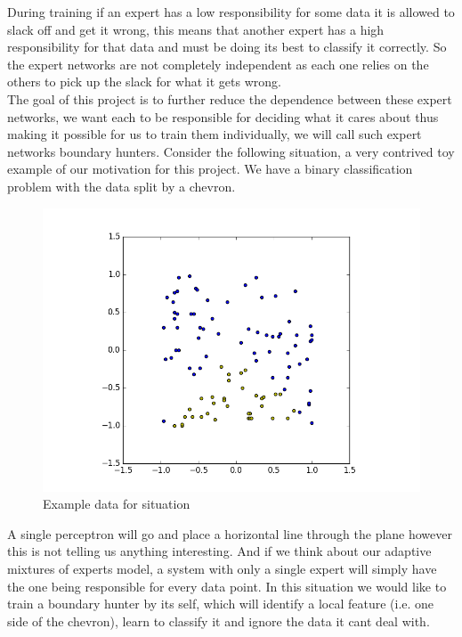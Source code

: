 \documentclass[notitlepage]{report}
\theoremstyle{definition}
\begin{document}
During training if an expert has a low responsibility for some data it is allowed to slack off and get it wrong, this means that another expert has a high responsibility for that data and must be doing its best to classify it correctly. So the expert networks are not completely independent as each one relies on the others to pick up the slack for what it gets wrong.\\

The goal of this project is to further reduce the dependence between these expert networks, we want each to be responsible for deciding what it cares about thus making it possible for us to train them individually, we will call such expert networks boundary hunters. Consider the following situation, a very contrived toy example of our motivation for this project. We have a binary classification problem with the data split by a chevron. 

\begin{figure}[H]
	\centering
	\begin{minipage}[b]{0.8\textwidth}
		\includegraphics[width=\textwidth]{CHEV-DATA-EX.png}
		\caption{Example data for situation}
	\end{minipage}
	\hfill
\end{figure}

A single perceptron will go and place a horizontal line through the plane however this is not telling us anything interesting. And if we think about our adaptive mixtures of experts model, a system with only a single expert will simply have the one being responsible for every data point. In this situation we would like to train a boundary hunter by its self, which will identify a local feature (i.e. one side of the chevron), learn to classify it and ignore the data it cant deal with.
\end{document}
